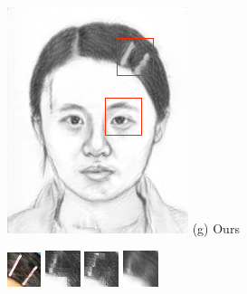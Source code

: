 \documentclass[10pt,twocolumn,letterpaper]{article}
\begin{document}
\begin{figure}[t]
\begin{minipage}[t]{0.24\linewidth}
\includegraphics[width=1\linewidth]{img/example_ours.png}
(g) Ours
\end{minipage}
\begin{minipage}[t]{1\linewidth}
\centering
\includegraphics[width=0.11\linewidth]{img/hairpin_photo_patch.png}
\includegraphics[width=0.11\linewidth]{img/hairpin_mrf_patch.png}
\includegraphics[width=0.11\linewidth]{img/hairpin_wmrf_patch.png}
\includegraphics[width=0.11\linewidth]{img/hairpin_ssd_patch.png}

\end{minipage}
\end{figure}
\end{document}
